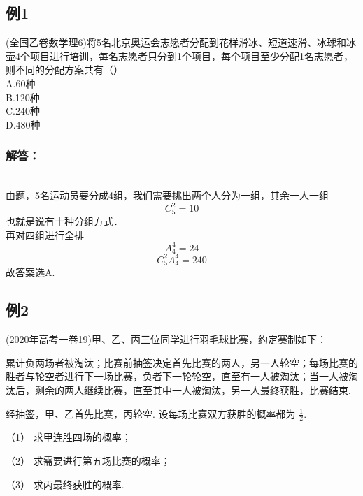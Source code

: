 
\begin{issues}
\issueDraft
\end{issues}
\subsection{例1}
(全国乙卷数学理6)将5名北京奥运会志愿者分配到花样滑冰、短道速滑、冰球和冰壶4个项目进行培训，每名志愿者只分到1个项目，每个项目至少分配1名志愿者，则不同的分配方案共有（）\\
A.60种\\
B.120种\\
C.240种\\
D.480种

\subsubsection{解答：}\\
由题，5名运动员要分成4组，我们需要挑出两个人分为一组，其余一人一组
\begin{equation}
C_5^2 = 10 
\end{equation}
也就是说有十种分组方式．\\
再对四组进行全排
\begin{equation}
A_4^4 = 24
\end{equation}
\begin{equation}
C_5^2A_4^4 =240 
\end{equation}
故答案选A.

\subsection{例2}
(2020年高考一卷19)甲、乙、丙三位同学进行羽毛球比赛，约定赛制如下：

累计负两场者被淘汰；比赛前抽签决定首先比赛的两人，另一人轮空；每场比赛的胜者与轮空者进行下一场比赛，负者下一轮轮空，直至有一人被淘汰；当一人被淘汰后，剩余的两人继续比赛，直至其中一人被淘汰，另一人最终获胜，比赛结束.

经抽签，甲、乙首先比赛，丙轮空. 设每场比赛双方获胜的概率都为 $\frac{1}{2}$.

（1）  求甲连胜四场的概率；

（2）  求需要进行第五场比赛的概率；

（3）  求丙最终获胜的概率.
